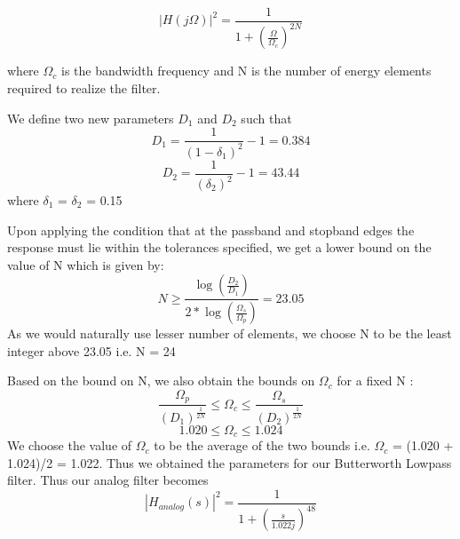 \documentclass{article}
\begin{document}
\begin{equation*}
    |H(j\Omega)|^2 = \frac{1}{1 + (\frac{\Omega}{\Omega_c})^{2N}}
\end{equation*}

where $\Omega_c$ is the bandwidth frequency and N is the number of energy elements required to realize the filter.

\vspace{1em}
\noindent
We define two new parameters $D_1$ and $D_2$ such that
\begin{equation*}
    D_1 = \frac{1}{(1 - \delta_1)^2} - 1 = 0.384
\end{equation*}
\begin{equation}
    D_2 = \frac{1}{(\delta_2)^2} - 1 = 43.44
\end{equation}
where $\delta_1$ = $\delta_2$ = 0.15

\vspace{1em}
\noindent
Upon applying the condition that at the passband and stopband edges the response must lie within the tolerances specified, we get a lower bound on the value of N which is given by:
\begin{equation*}
    N \geq \frac{\log(\frac{D_2}{D_1})}{2*\log(\frac{\Omega_s}{\Omega_p})} = 23.05
\end{equation*}
As we would naturally use lesser number of elements, we choose N to be the least integer above 23.05 i.e. N = 24

\vspace{1em}
\noindent
Based on the bound on N, we also obtain the bounds on $\Omega_c$ for a fixed N :
\begin{equation*}
    \frac{\Omega_p}{(D_1)^{\frac{1}{2N}}} \leq \Omega_c \leq \frac{\Omega_s}{(D_2)^{\frac{1}{2N}}}
\end{equation*}
\begin{equation*}
    1.020 \leq \Omega_c \leq 1.024
\end{equation*}
We choose the value of $\Omega_c$ to be the average of the two bounds i.e. $\Omega_c$ = (1.020 + 1.024)/2 = 1.022. Thus we obtained the parameters for our Butterworth Lowpass filter.
\noindent
\vspace{1em}
Thus our analog filter becomes 
\begin{equation*}
    |H_{analog}(s)|^2 = \frac{1}{1+(\frac{s}{1.022j})^{48}}
\end{equation*}
\end{document}

